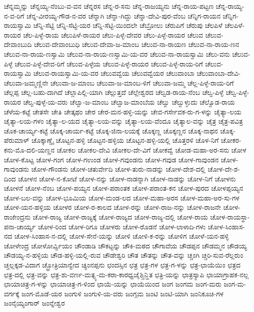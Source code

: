ಚೆನ್ನಮ್ಮನ್ನು
ಚೆನ್ನಯ್ಯ-ನೆಂಬು-ವ-ವನ
ಚೆನ್ನರಸ
ಚೆನ್ನ-ರ-ಸನು
ಚೆನ್ನ-ರಾಜಯ್ಯನು
ಚೆನ್ನ-ರಾಯ-ಪಟ್ಟಣ
ಚೆನ್ನ-ರಾಯ್ಯ-ನ-ವ-ರಿಗೆ
ಚೆನ್ನ-ವೀರಯ್ಯ-ಗೌಡ-ನ-ವರ
ಚೆನ್ನಾಗಿ
ಚೆನ್ನಾ-ಗಿದ್ದು
ಚೆನ್ನಾ-ದೇವಿ-ಪುರ-ವೆಂಬ
ಚೆನ್ನಿಗ-ರಾಯನ
ಚೆನ್ನಿಗ-ರಾಯಸ್ವಾಮಿ
ಚೆನ್ನಿ-ಸೆಟ್ಟಿ
ಚೆನ್ನಿ-ಸೆಟ್ಟಿ-ಯರ
ಚೆನ್ನಿ-ಸೆಟ್ಟಿ-ಯಿಂದಲೇ
ಚೆಬ್ರೋಲು
ಚೆರುಪಿಗೆ
ಚೆರುಪು
ಚೆಲಪಿಳೆ
ಚೆಲಪಿಳೆ-ರಾಯರ
ಚೆಲ-ಪಿಳ್ಳೆ-ರಾಯ
ಚೆಲುಪಿಳೆ-ರಾಯರ
ಚೆಲು-ಪಿಳ್ಳೆ-ದೇವರ
ಚೆಲು-ಪಿಳ್ಳೆ-ರಾಯರ
ಚೆಲುವ
ಚೆಲುವ-ದೇವಾಂಬುದಿ
ಚೆಲುವ-ದೇವಾಂಬುಧಿ
ಚೆಲುವ-ದೇವಾ-ಜ-ಮಾಂಬ
ಚೆಲುವ-ನಾ-ರಾಯಣ
ಚೆಲುವ-ನಾ-ರಾಯ-ಣನ
ಚೆಲುವ-ನಾ-ರಾಯ-ಣಸ್ವಾಮಿ
ಚೆಲುವ-ನಾ-ರಾಯ-ಣಸ್ವಾಮಿ-ಯ-ವರ
ಚೆಲುವ-ನಾ-ರಾಯಸ್ವಾಮಿ
ಚೆಲು-ವನು
ಚೆಲುವ-ಪಿಳ್ಳೆ
ಚೆಲುವ-ಪಿಳ್ಳೆ-ದೇವ-ರಿಗೆ
ಚೆಲುವ-ಪಿಳ್ಳೆಯ
ಚೆಲುವ-ಪಿಳ್ಳೆ-ರಾಯರ
ಚೆಲುವ-ಪಿಳ್ಳೆ-ರಾಯ-ರಿಗೆ
ಚೆಲುವ-ರಾಯಸ್ವಾಮಿ
ಚೆಲುವ-ರಾಯಸ್ವಾಮಿ-ಯ-ವರ
ಚೆಲುವವ್ವೆಯ
ಚೆಲುವವ್ವೆಯರ
ಚೆಲುವಾಂಬಾ
ಚೆಲುವಾಂಬಾ-ದೇವಿ-ಚೆಲುವಾ-ಜಮ್ಮಣ್ಣಿನೇ
ಚೆಲುವಾ-ಜ-ಮಾಂಬ
ಚೆಲುವಾ-ಜ-ಮಾಂಬ-ಳಿಗೆ
ಚೆಲುವಾ-ಜಮ್ಮ
ಚೆಲ್ಲ-ಪಿಳ್ಳೆ-ರಾಯ-ರಿಗೆ
ಚೆಲ್ಲಪ್ಪ
ಚೆಲ್ಲ-ಬಹು-ದಾಗಿದೆ
ಚೆಲ್ಲಾಪಿಲ್ಲಿ-ಯಾಗಿ
ಚೆಲ್ಲುತ್ತದೆ
ಚೆಲ್ಲೇಶ್ವರದ
ಚೆಲ್ವಡ-ರಾಯ-ನೆಂಬ
ಚೆಲ್ವ-ಪಿಳ್ಳೆ
ಚೆಲ್ವ-ಪಿಳ್ಳೆ-ರಾಯರ
ಚೆಲ್ವ-ಪುಳ್ಳೆ-ಯ-ವರು
ಚೆಲ್ವಾ-ಜ-ಮಾಂಬ
ಚೆಲ್ವಾಜ-ಮಾಂಬೆಯ
ಚೆಲ್ವು
ಚೆಲ್ವುಳ್ಳುದು
ಚೆಲ್ವೊಡ-ರಾಯ
ಚೆಳೆಯ-ಕಟ್ಟೆ
ಚೇತಸೇ
ಚೇತಿ
ಚೇತ್ಕಥಂ
ಚೇರ
ಚೇರ-ಮನ-ಹಳ್ಳಿ-ಯನ್ನು
ಚೇವ-ಗರ್ಸೇವಕ-ರು-ಗ-ಳನ್ನು
ಚೈತ್ಯಾ-ಲಯ
ಚೈತ್ಯಾ-ಲಯ-ಗಳಂ
ಚೈತ್ಯಾ-ಲ-ಯದ
ಚೈತ್ಯಾ-ಲಯ-ವನ್ನು
ಚೈತ್ಯಾ-ಲಯ-ವೆಂದೂ
ಚೈತ್ಯಾಲ-ವನ್ನು
ಚೈತ್ರ
ಚೈತ್ರ-ಪವಿತ್ರ
ಚೊಕ-ಚಾರ್ಯ್ಯ-ಕಟ್ಟೆ
ಚೊಕ್ಕ-ಚಾರ್ಯ-ಕಟ್ಟೆ
ಚೊಕ್ಕ-ಜಿನಾ-ಲಯಕ್ಕೆ
ಚೊಕ್ಕಣ್ಣ
ಚೊಕ್ಕಣ್ಣನ
ಚೊಕ್ಕ-ನಾಥನ
ಚೊಕ್ಕ-ಪೆರುಮಾಳ್
ಚೊಕ್ಕಾಣ್ಡೈ
ಚೊಟ್ಟನ-ಹಳ್ಳಿ
ಚೊಟ್ಟನ-ಹಳ್ಳಿಯ
ಚೊಟ್ಟನ-ಹಳ್ಳಿ-ಯಲ್ಲಿ
ಚೊತ್ತರಳಿ
ಚೊಳ-ನಿಗೆ
ಚೋಕರ-ಕನು-ಮೊ-ದಲಿ-ಯಣ್ಣನ
ಚೋಕಲ
ಚೋಕಲ-ದೇವಿ
ಚೋಕಲ-ದೇ-ವಿಗೆ
ಚೋಕವ್ವೆ
ಚೋಡ-ಮಹಾ-ಅರ-ಸನು
ಚೋಳ
ಚೋಳ-ಕೊಟ್ಟ
ಚೋಳ-ಗಂಗ
ಚೋಳ-ಗಉಂಡ
ಚೋಳ-ಗವುಂಡನು
ಚೋಳ-ಗವುಡ
ಚೋಳ-ಗಾವುಂಡನ
ಚೋಳ-ಗಾವುಂಡನು
ಚೋಳ-ಗೌಂಡನು
ಚೋಳ-ಚತುರ್ವೇದಿ
ಚೋಳ-ತುರು-ನಾಡನ್ನು
ಚೋಳ-ದೇಶ-ದಲ್ಲಿ
ಚೋಳ-ದೇ-ಶ-ದಿಂದ
ಚೋಳನ
ಚೋಳ-ನ-ಕೋಟೆ
ಚೋಳ-ನನ್ನು
ಚೋಳ-ನಾಡನ್ನಾಗಿ
ಚೋಳ-ನಾಡನ್ನು
ಚೋಳ-ನಿಗೆ
ಚೋಳನು
ಚೋಳನೆ
ಚೋಳ-ನೆಂಬ
ಚೋಳ-ಪಯ್ಯನ
ಚೋಳ-ಪರಾಂತಕ
ಚೋಳ-ಪರಾಂತ-ಕನ
ಚೋಳ-ಪುರದ
ಚೋಳಪ್ಪಯ್ಯನ
ಚೋಳ-ಬಲ-ವನ್ನು
ಚೋಳ-ಭೂಮಿಯ
ಚೋಳ-ಮಂಡ-ಲದ
ಚೋಳ-ಮಹಾ-ಅರಸ
ಚೋಳ-ಮಹಾ-ಅರ-ಸು-ಗಳ
ಚೋಳ-ಯನ-ಹಳ್ಳಿಯ
ಚೋಳರ
ಚೋಳ-ರ-ಕಾಲದ
ಚೋಳ-ರನ್ನು
ಚೋಳ-ರಾಜ-ನನ್ನು
ಚೋಳ-ರಾಜನೇ
ಚೋಳ-ರಾಜೇಂದ್ರನು
ಚೋಳ-ರಾಜ್ಯ
ಚೋಳ-ರಾಜ್ಯಕ್ಕೆ
ಚೋಳ-ರಾಜ್ಯದ
ಚೋಳ-ರಾಜ್ಯ-ದಲ್ಲಿ
ಚೋಳ-ರಾಯ
ಚೋಳ-ರಾಯಸ್ಥಾ-ಪನಾ-ಚಾರ್ಯ್ಯ
ಚೋಳ-ರಿಂದ
ಚೋಳ-ರಿಗೂ
ಚೋಳರು
ಚೋಳ-ರೊಡನೆ
ಚೋಳ-ಲಾಳಾದಿ-ಗಳು
ಚೋಳ-ಸಿಂಹಾಸ-ನದ
ಚೋಳ-ಸಿಂಹಾಸ-ನ-ದಲ್ಲಿ
ಚೋಳ-ಸೇನೆ-ಯನ್ನು
ಚೋಳಿ
ಚೋಳಿ-ಕ-ರನ್ನು
ಚೋಳಿಗ
ಚೋಳೆ-ಯನ-ಹಳ್ಳಿ
ಚೋಳೇಂದ್ರ
ಚೋಳೋರ್ವ್ವಿಯಂ
ಚೌಂಡಾಡಿ
ಚೌಕಟ್ಟನ್ನು
ಚೌಕಿ-ಮಠದ
ಚೌಗಾವೆಯ
ಚೌಡಪ್ಪನ
ಚೌಡಮ್ಮನ
ಚೌಡಯ್ಯ
ಚೌಡಯ್ಯ-ನ-ಹಳ್ಳಿಯ
ಚೌಡ-ಹಳ್ಳಿ-ಯಲ್ಲಿ-ರುವ
ಚೌಡೇಶ್ವರಿ
ಚೌತ
ಚೌತನ್ನು
ಚೌತ-ವನ್ನು
ಚ್ಚಂಗಿ
ಚ್ಚರಿ-ಸುವ-ರೆಲ್ಲರುಂ
ಚ್ಚಲ್ಲಕ್ಕಡ-ವಿದಾಗ
ಚ್ಛ್ರೋತ್ರಿಯಾನ್ವೇದ
ಚ್ಯಂನಪ್ಪನು
ಛಂದಸ್ಸಿನ
ಛತ್ರ
ಛತ್ರ-ಗಳ
ಛತ್ರ-ಗ-ಳನ್ನು
ಛತ್ರ-ಛಾಯೆಯಿಂ
ಛತ್ರದ
ಛತ್ರ-ದಲ್ಲಿ
ಛತ್ರ-ವನ್ನು
ಛತ್ರ-ಶು-ವರ್ಣ-ಮತ್ಸ್ಯ-ಮ-ಕರಾ-ಕಾರಧ್ವಜೈಶ್ಚಿನ್ಹಿತ
ಛತ್ರಿ-ಯನ್ನು
ಛಾತ್ರಸ್ಯಾಪಿ
ಛಾಯಾಗ್ರಾಹಕ-ನಲ್ಲ
ಛಾಯಾಚಿತ್ರ-ಗ-ಳನ್ನು
ಛಾಯಾಚಿತ್ರ-ಗ-ಳಿಂದ
ಛಾಯೆ-ಯನ್ನು
ಛಾಯೆಯಿಂದ
ಜಂಗ
ಜಂಗಮ
ಜಂಗ-ಮರು
ಜಂಗ-ಮ-ವರ್ಗಕ್ಕೆ
ಜಂಗ-ಮೊಡೆ-ಯರ
ಜಂಗುಳಿ
ಜಂಗುಳಿ-ಯ-ವರು
ಜಂಗ್ಗಮ
ಜಂಟಿ
ಜಂಟಿ-ಯಾಗಿ
ಜಂನಿಕೂಚಿ-ಗಳ
ಜಂನೈಯ್ಯಂಗಾರ್
ಜಂನ್ನೇಶ್ವರ
